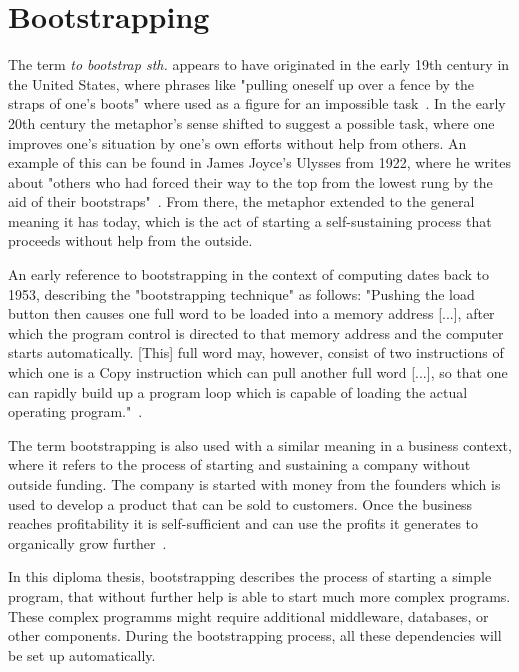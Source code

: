\section{Bootstrapping}
\label{fundamentals:bootstrapping}

The term \textit{to bootstrap sth.} appears to have originated in the early 19th century in the United States, where phrases like "pulling oneself up over a fence by the straps of one's boots" where used as a figure for an impossible task~\autocite{bootstrap:history}.
In the early 20th century the metaphor's sense shifted to suggest a possible task, where one improves one's situation by one's own efforts without help from others.
An example of this can be found in James Joyce's Ulysses from 1922, where he writes about "others who had forced their way to the top from the lowest rung by the aid of their bootstraps"~\autocite{bootstrap:ulysses}.
From there, the metaphor extended to the general meaning it has today, which is the act of starting a self-sustaining process that proceeds without help from the outside.

An early reference to bootstrapping in the context of computing dates back to 1953, describing the "bootstrapping technique" as follows: "Pushing the load button then causes one full word to be loaded into a memory address [...], after which the program control is directed to that memory address and the computer starts automatically. [This] full word may, however, consist of two instructions of which one is a Copy instruction which can pull another full word [...], so that one can rapidly build up a program loop which is capable of loading the actual operating program."~\autocite[p.~1273]{bootstrap:early}.

The term bootstrapping is also used with a similar meaning in a business context, where it refers to the process of starting and sustaining a company without outside funding.
The company is started with money from the founders which is used to develop a product that can be sold to customers.
Once the business reaches profitability it is self-sufficient and can use the profits it generates to organically grow further~\autocite{bootstrap:business}.

In this diploma thesis, bootstrapping describes the process of starting a simple program, that without further help is able to start much more complex programs.
These complex programms might require additional middleware, databases, or other components.
During the bootstrapping process, all these dependencies will be set up automatically.
